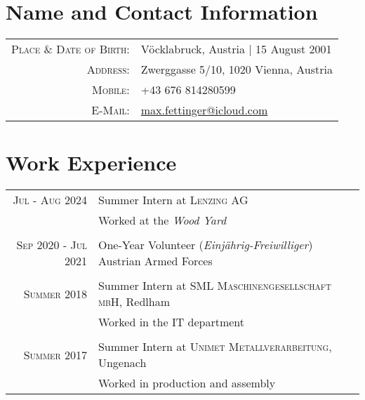 \documentclass[a4paper,10pt]{article} %
\begin{document}
\pagestyle{empty} %


\par{\bigskip\par} %

\section{Name and Contact Information}

\begin{tabular}{rl}
\textsc{Place \& Date of Birth:} & Vöcklabruck, Austria  | 15 August 2001 \\
\textsc{Address:} & Zwerggasse 5/10, 1020 Vienna, Austria \\
\textsc{Mobile:} & +43 676 814280599\\
\textsc{E-Mail:} & \href{mailto:max.fettinger@icloud.com}{max.fettinger@icloud.com}
\end{tabular}


\section{Work Experience}

\begin{tabular}{r|p{11cm}}
\textsc{Jul - Aug 2024} & Summer Intern at \textsc{Lenzing AG} \\
& \footnotesize{Worked at the \emph{Wood Yard}}\\ 
\multicolumn{2}{c}{} \\

\textsc{Sep 2020 - Jul 2021} & One-Year Volunteer (\emph{Einjährig-Freiwilliger}) Austrian Armed Forces \\
\multicolumn{2}{c}{} \\


\textsc{Summer 2018} & Summer Intern at \textsc{SML Maschinengesellschaft mbH}, Redlham \emph{}\\
& \footnotesize{Worked in the IT department}\\
\multicolumn{2}{c}{} \\


\textsc{Summer 2017} & Summer Intern at \textsc{Unimet Metallverarbeitung}, Ungenach \emph{}\\
& \footnotesize{Worked in production and assembly}
\end{tabular}
\end{document}
